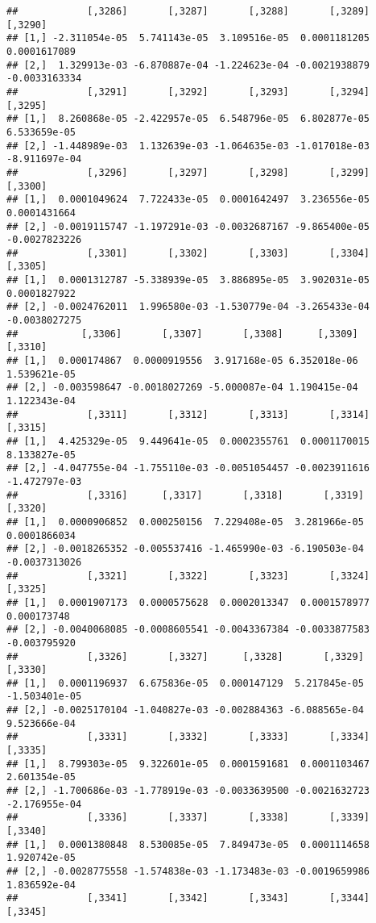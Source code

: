\documentclass[
]{article}
\begin{document}
\begin{verbatim}
##            [,3286]       [,3287]       [,3288]       [,3289]       [,3290]
## [1,] -2.311054e-05  5.741143e-05  3.109516e-05  0.0001181205  0.0001617089
## [2,]  1.329913e-03 -6.870887e-04 -1.224623e-04 -0.0021938879 -0.0033163334
##            [,3291]       [,3292]       [,3293]       [,3294]       [,3295]
## [1,]  8.260868e-05 -2.422957e-05  6.548796e-05  6.802877e-05  6.533659e-05
## [2,] -1.448989e-03  1.132639e-03 -1.064635e-03 -1.017018e-03 -8.911697e-04
##            [,3296]       [,3297]       [,3298]       [,3299]       [,3300]
## [1,]  0.0001049624  7.722433e-05  0.0001642497  3.236556e-05  0.0001431664
## [2,] -0.0019115747 -1.197291e-03 -0.0032687167 -9.865400e-05 -0.0027823226
##            [,3301]       [,3302]       [,3303]       [,3304]       [,3305]
## [1,]  0.0001312787 -5.338939e-05  3.886895e-05  3.902031e-05  0.0001827922
## [2,] -0.0024762011  1.996580e-03 -1.530779e-04 -3.265433e-04 -0.0038027275
##           [,3306]       [,3307]       [,3308]      [,3309]      [,3310]
## [1,]  0.000174867  0.0000919556  3.917168e-05 6.352018e-06 1.539621e-05
## [2,] -0.003598647 -0.0018027269 -5.000087e-04 1.190415e-04 1.122343e-04
##            [,3311]       [,3312]       [,3313]       [,3314]       [,3315]
## [1,]  4.425329e-05  9.449641e-05  0.0002355761  0.0001170015  8.133827e-05
## [2,] -4.047755e-04 -1.755110e-03 -0.0051054457 -0.0023911616 -1.472797e-03
##            [,3316]      [,3317]       [,3318]       [,3319]       [,3320]
## [1,]  0.0000906852  0.000250156  7.229408e-05  3.281966e-05  0.0001866034
## [2,] -0.0018265352 -0.005537416 -1.465990e-03 -6.190503e-04 -0.0037313026
##            [,3321]       [,3322]       [,3323]       [,3324]      [,3325]
## [1,]  0.0001907173  0.0000575628  0.0002013347  0.0001578977  0.000173748
## [2,] -0.0040068085 -0.0008605541 -0.0043367384 -0.0033877583 -0.003795920
##            [,3326]       [,3327]      [,3328]       [,3329]       [,3330]
## [1,]  0.0001196937  6.675836e-05  0.000147129  5.217845e-05 -1.503401e-05
## [2,] -0.0025170104 -1.040827e-03 -0.002884363 -6.088565e-04  9.523666e-04
##            [,3331]       [,3332]       [,3333]       [,3334]       [,3335]
## [1,]  8.799303e-05  9.322601e-05  0.0001591681  0.0001103467  2.601354e-05
## [2,] -1.700686e-03 -1.778919e-03 -0.0033639500 -0.0021632723 -2.176955e-04
##            [,3336]       [,3337]       [,3338]       [,3339]      [,3340]
## [1,]  0.0001380848  8.530085e-05  7.849473e-05  0.0001114658 1.920742e-05
## [2,] -0.0028775558 -1.574838e-03 -1.173483e-03 -0.0019659986 1.836592e-04
##            [,3341]       [,3342]       [,3343]       [,3344]       [,3345]

\end{verbatim}
\end{document}
